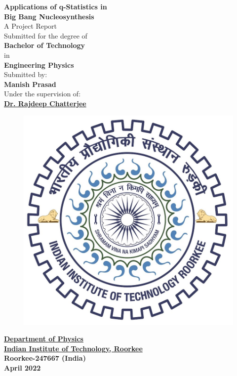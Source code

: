 \documentclass[11pt]{article}
\numberwithin{equation}{section}
\begin{document}


\begin{titlepage}
\begin{center}
 
 {\huge\bfseries Applications of q-Statistics in \\ Big Bang Nucleosynthesis\\}
 \vspace{1.4cm}
 {A Project Report} \\
 {Submitted for the degree of} \\[1.1cm]
 {\Large\bfseries Bachelor of Technology}\\[5pt]
 {in}\\[8pt]
 {\Large\bfseries Engineering Physics}\\[5pt]
 \vspace{1.2cm}
 Submitted by:\\[5pt]
 {\Large\bfseries Manish Prasad}\\[8pt]
 Under the supervision of:\\[5pt]
 {\Large\bfseries \href{https://ph.iitr.ac.in/~PH/rcfphfph}{Dr. Rajdeep Chatterjee}}\\
\vspace{1.2cm} 
 \begin{figure}[H]
  \centering
  \includegraphics[width=0.3\linewidth]{"./Figures/logo.jpg"}
\end{figure}
\href{https://ph.iitr.ac.in/}{\textbf{Department of Physics}}\\[5pt]
\href{https://iitr.ac.in/}{\textbf{Indian Institute of Technology, Roorkee}}\\[5pt]
{\textbf{Roorkee-247667 (India)}}\\[5pt]
{\textbf{April 2022}}
\end{center}
\end{titlepage}
\pagebreak
\end{document}
